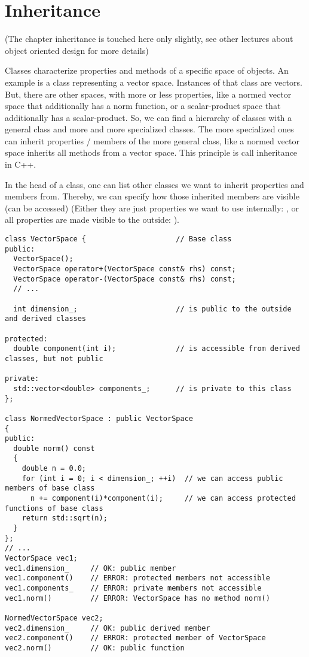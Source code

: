 \section{Inheritance\label{sec:inheritance}}
(The chapter inheritance is touched here only slightly, see other lectures about object oriented design for more details)

Classes characterize properties and methods of a specific space of objects. An example is a class representing a vector space. Instances of that
class are vectors. But, there are other spaces, with more or less properties, like a normed vector space that additionally has a norm function, or
a scalar-product space that additionally has a scalar-product. So, we can find a hierarchy of classes with a general class and more and more specialized
classes. The more specialized ones can inherit properties / members of the more general class, like a normed vector space inherits all methods from a
vector space. This principle is call inheritance in C++.

In the head of a class, one can list other classes we want to inherit properties and members from. Thereby, we can specify how those inherited members
are visible (can be accessed) (Either they are just properties we want to use internally: , or all properties are made visible to the outside:
).

\begin{verbatim}
class VectorSpace {                     // Base class
public:
  VectorSpace();
  VectorSpace operator+(VectorSpace const& rhs) const;
  VectorSpace operator-(VectorSpace const& rhs) const;
  // ...

  int dimension_;                       // is public to the outside and derived classes

protected:
  double component(int i);              // is accessible from derived classes, but not public

private:
  std::vector<double> components_;      // is private to this class
};

class NormedVectorSpace : public VectorSpace
{
public:
  double norm() const
  {
    double n = 0.0;
    for (int i = 0; i < dimension_; ++i)  // we can access public members of base class
      n += component(i)*component(i);     // we can access protected functions of base class
    return std::sqrt(n);
  }
};
// ...
VectorSpace vec1;
vec1.dimension_     // OK: public member
vec1.component()    // ERROR: protected members not accessible
vec1.components_    // ERROR: private members not accessible
vec1.norm()         // ERROR: VectorSpace has no method norm()

NormedVectorSpace vec2;
vec2.dimension_     // OK: public derived member
vec2.component()    // ERROR: protected member of VectorSpace
vec2.norm()         // OK: public function
\end{verbatim}

